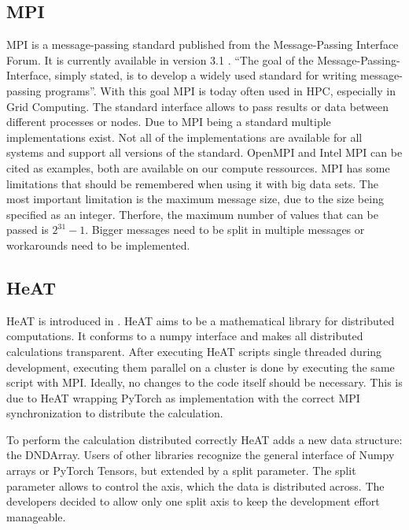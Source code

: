 \subsection{MPI}
\label{subec:mpi}
\gls{MPI} is a message-passing standard published from the Message-Passing Interface Forum. It is currently available in version 3.1 \cite{message_passing_interface_forum_mpi_2015}.
\enquote{The goal of the Message-Passing-Interface, simply stated, is to develop a widely used standard for writing message-passing programs}\cite{message_passing_interface_forum_mpi_2015}.
With this goal \gls{MPI} is today often used in \gls{HPC}, especially in Grid Computing. The standard interface allows to pass results or data between different processes or nodes.
Due to \gls{MPI} being a standard multiple implementations exist. Not all of the implementations are available for all systems and support all versions of the standard.
OpenMPI \cite{noauthor_open_nodate} and Intel MPI \cite{noauthor_intel_nodate} can be cited as examples, both are available on our compute ressources.
\gls{MPI} has some limitations that should be remembered when using it with big data sets. The most important limitation is the maximum message size, due to the size
being specified as an integer. Therfore, the maximum number of values that can be passed is \(2^{31} - 1\). Bigger messages need to be split in multiple messages or workarounds need to be implemented.

\subsection{HeAT}
\label{subsec:heat}
\gls{HeAT} is introduced in \cite{krajsek_helmholtz_nodate}. \gls{HeAT} aims to be a mathematical library for distributed computations.
It conforms to a \gls{numpy} \cite{noauthor_numpy_nodate} interface and makes all distributed calculations transparent.
After executing \gls{HeAT} scripts single threaded during development, executing them parallel on a cluster is done by executing the same script with \gls{MPI}.
Ideally, no changes to the code itself should be necessary.
This is due to \gls{HeAT} wrapping \gls{PyTorch} as implementation with the correct \gls{MPI} synchronization to distribute the calculation.

To perform the calculation distributed correctly \gls{HeAT} adds a new data structure: the DNDArray. Users of other libraries
recognize the general interface of Numpy arrays or PyTorch Tensors, but extended by a split parameter.
The split parameter allows to control the axis, which the data is distributed across.
The developers decided to allow only one split axis to keep the development effort manageable.


